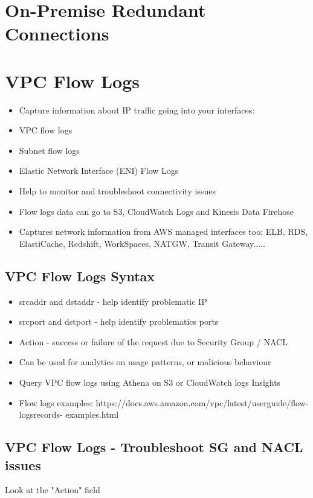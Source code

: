\section{On-Premise Redundant Connections}


\section{VPC Flow Logs}
\begin{itemize}
    \item Capture information about IP traffic going into your interfaces:
    \item VPC flow logs
    \item Subnet flow logs
    \item Elastic Network Interface (ENI) Flow Logs
    \item Help to monitor and troubleshoot connectivity issues
    \item Flow logs data can go to S3, CloudWatch Logs and Kinesis Data Firehose
    \item Captures network information from AWS managed interfaces too: ELB, RDS, ElastiCache, Redshift, WorkSpaces, NATGW, Transit Gateway.....
\end{itemize}

\subsection{VPC Flow Logs Syntax}
\begin{itemize}
    \item srcaddr and dstaddr - help identify problematic IP
    \item srcport and dstport - help identify problematics ports
    \item Action - success or failure of the request due to Security Group / NACL
    \item Can be used for analytics on usage patterns, or malicious behaviour
    \item Query VPC flow logs using Athena on S3 or CloudWatch logs Insights
    \item Flow logs examples: https://docs.aws.amazon.com/vpc/latest/userguide/flow-logsrecords-
    examples.html
\end{itemize}

\subsection{VPC Flow Logs - Troubleshoot SG and NACL issues}
Look at the "Action" field

